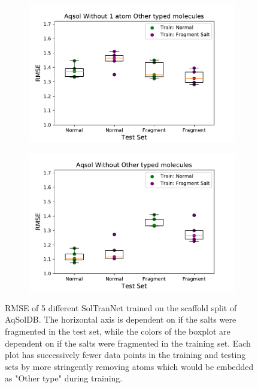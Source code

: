 \documentclass[journal=jmcmar,manuscript=article]{achemso}
\begin{document}
\begin{figure}[tb]
    \begin{subfigure}[t]{0.48\textwidth}
        \centering
        \includegraphics[width=\linewidth]{figures/others2plus_saltfragfirst_RMSEs_boxplots.pdf}
    \end{subfigure}%
    \hfill
    \begin{subfigure}[t]{0.48\textwidth}
        \centering
        \includegraphics[width=\linewidth]{figures/noothers_saltfragfirst_RMSEs_boxplots.pdf}
    \end{subfigure}
    \caption{RMSE of 5 different SolTranNet trained on the scaffold split of AqSolDB. The horizontal axis is dependent on if the salts were fragmented in the test set, while the colors of the boxplot are dependent on if the salts were fragmented in the training set. Each plot has successively fewer data points in the training and testing sets by more stringently removing atoms which would be embedded as "Other type" during training.}
    \label{fig:saltfragrmse}
\end{figure}
\end{document}
